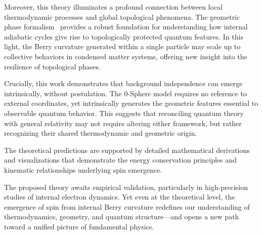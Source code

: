 \documentclass[%
 reprint,
 amsmath,amssymb,
 aps,
]{revtex4-1}
\numberwithin{equation}{section}%
\begin{document}
Moreover, this theory illuminates a profound connection between local thermodynamic processes and global topological phenomena. The geometric phase formalism~\cite{shapere1989geometric} provides a robust foundation for understanding how internal adiabatic cycles give rise to topologically protected quantum features. In this light, the Berry curvature generated within a single particle may scale up to collective behaviors in condensed matter systems, offering new insight into the resilience of topological phases.

Crucially, this work demonstrates that background independence can emerge intrinsically, without postulation. The 0-Sphere model requires no reference to external coordinates, yet intrinsically generates the geometric features essential to observable quantum behavior. This suggests that reconciling quantum theory with general relativity may not require altering either framework, but rather recognizing their shared thermodynamic and geometric origin.

The theoretical predictions are supported by detailed mathematical derivations and visualizations that demonstrate the energy conservation principles and kinematic relationships underlying spin emergence.

The proposed theory awaits empirical validation, particularly in high-precision studies of internal electron dynamics. Yet even at the theoretical level, the emergence of spin from internal Berry curvature redefines our understanding of thermodynamics, geometry, and quantum structure—and opens a new path toward a unified picture of fundamental physics.
\end{document}
